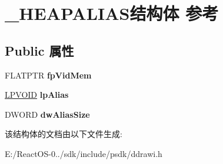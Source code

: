 \hypertarget{struct___h_e_a_p_a_l_i_a_s}{}\section{\+\_\+\+H\+E\+A\+P\+A\+L\+I\+A\+S结构体 参考}
\label{struct___h_e_a_p_a_l_i_a_s}
\subsection*{Public 属性}
\begin{DoxyCompactItemize}
\item 
\mbox{\label{struct___h_e_a_p_a_l_i_a_s_a8e2740ed4adb58ff40f9d7eb3c488ef8}} 
F\+L\+A\+T\+P\+TR {\bfseries fp\+Vid\+Mem}
\item 
\mbox{\label{struct___h_e_a_p_a_l_i_a_s_abada29d21e590dce844564f83ea8b4bd}} 
\hyperlink{interfacevoid}{L\+P\+V\+O\+ID} {\bfseries lp\+Alias}
\item 
\mbox{\label{struct___h_e_a_p_a_l_i_a_s_a33241fce9599e8a57522c00082f0bcc8}} 
D\+W\+O\+RD {\bfseries dw\+Alias\+Size}
\end{DoxyCompactItemize}


该结构体的文档由以下文件生成\+:\begin{DoxyCompactItemize}
\item 
E\+:/\+React\+O\+S-\/0../sdk/include/psdk/ddrawi.\+h\end{DoxyCompactItemize}
